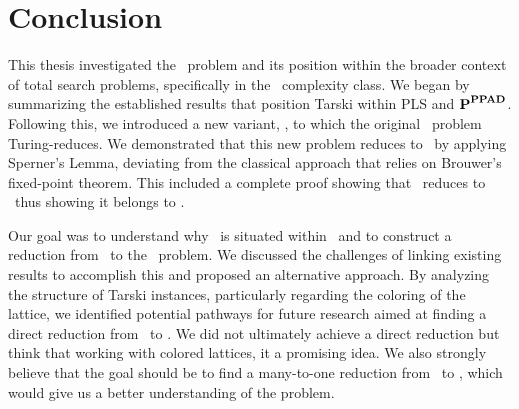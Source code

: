 \chapter{Conclusion}\label{ch:conclusion}

This thesis investigated the \Tarski\ problem and its position within the broader context of total search problems, specifically in the \TFNP\ complexity class. We began by summarizing the established results that position Tarski within PLS and ${\textbf{P}}^{\textbf{PPAD}}$. Following this, we introduced a new variant, \Tarskistar, to which the original \Tarski\ problem Turing-reduces. We demonstrated that this new problem reduces to \EndOfLine\ by applying Sperner's Lemma, deviating from the classical approach that relies on Brouwer's fixed-point theorem. This included a complete proof showing that \Sperner\ reduces to \EndOfLine\ thus showing it belongs to \PPAD\@.

Our goal was to understand why \Tarski\ is situated within \EOPL\ and to construct a reduction from \Tarski\ to the \EndOfPotentialLine\ problem. We discussed the challenges of linking existing results to accomplish this and proposed an alternative approach. By analyzing the structure of Tarski instances, particularly regarding the coloring of the lattice, we identified potential pathways for future research aimed at finding a direct reduction from \Tarski\ to \EndOfPotentialLine. We did not ultimately achieve a direct reduction but think that working with colored lattices, it a promising idea. We also strongly believe that the goal should be to find a many-to-one reduction from \Tarskistar\ to \EndOfPotentialLine\@, which would give us a better understanding of the problem.